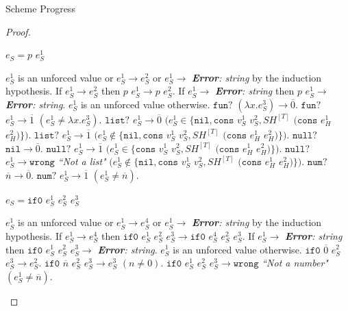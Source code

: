 \begin{theorem}{Scheme Progress}
\begin{proof}
\begin{case}
\end{case}


\begin{case}

$e_{S}=p$ $e_{S}^{1}$

$e_{S}^{1}$ is an unforced value or $e_{S}^{1}\rightarrow e_{S}^{2}$ or $e_{S}^{1}\rightarrow$ \emph{\textbf{Error}: string} by the induction hypothesis.  If $e_{S}^{1}\rightarrow e_{S}^{2}$ then $p$ $e_{S}^{1}\rightarrow p$ $e_{S}^{2}$.  If $e_{S}^{1}\rightarrow$ \emph{\textbf{Error}: string} then $p$ $e_{S}^{1}\rightarrow$ \emph{\textbf{Error}: string}.  $e_{S}^{1}$ is an unforced value otherwise.  $\mathtt{fun?}$ $(\lambda x.e_{S}^{3})\rightarrow\overline{0}$.  $\mathtt{fun?}$ $e_{S}^{1}\rightarrow\overline{1}$ $(e_{S}^{1}\neq\lambda x.e_{S}^{3})$.  $\mathtt{list?}$ $e_{S}^{1}\rightarrow\overline{0}$ $(e_{S}^{1}\in\lbrace\mathtt{nil},\mathtt{cons}$ $v_{S}^{1}$ $v_{S}^{2},SH^{[T]}$ $(\mathtt{cons}$ $e_{H}^{1}$ $e_{H}^{2})\rbrace)$.  $\mathtt{list?}$ $e_{S}^{1}\rightarrow\overline{1}$ $(e_{S}^{1}\not\in\lbrace\mathtt{nil},\mathtt{cons}$ $v_{S}^{1}$ $v_{S}^{2},SH^{[T]}$ $(\mathtt{cons}$ $e_{H}^{1}$ $e_{H}^{2})\rbrace)$.  $\mathtt{null?}$ $\mathtt{nil}\rightarrow\overline{0}$.  $\mathtt{null?}$ $e_{S}^{1}\rightarrow\overline{1}$ $(e_{S}^{1}\in\lbrace\mathtt{cons}$ $v_{S}^{1}$ $v_{S}^{2},SH^{[T]}$ $(\mathtt{cons}$ $e_{H}^{1}$ $e_{H}^{2})\rbrace)$.  $\mathtt{null?}$ $e_{S}^{1}\rightarrow\mathtt{wrong}$ \emph{``Not a list"} $(e_{S}^{1}\not\in\lbrace\mathtt{nil},\mathtt{cons}$ $v_{S}^{1}$ $v_{S}^{2},SH^{[T]}$ $(\mathtt{cons}$ $e_{H}^{1}$ $e_{H}^{2})\rbrace)$.  $\mathtt{num?}$ $\overline{n}\rightarrow\overline{0}$.  $\mathtt{num?}$ $e_{S}^{1}\rightarrow\overline{1}$ $(e_{S}^{1}\neq\overline{n})$.

\end{case}


\begin{case}

$e_{S}=\mathtt{if0}$ $e_{S}^{1}$ $e_{S}^{2}$ $e_{S}^{3}$

$e_{S}^{1}$ is an unforced value or $e_{S}^{1}\rightarrow e_{S}^{4}$ or $e_{S}^{1}\rightarrow$ \emph{\textbf{Error}: string} by the induction hypothesis.  If $e_{S}^{1}\rightarrow e_{S}^{4}$ then $\mathtt{if0}$ $e_{S}^{1}$ $e_{S}^{2}$ $e_{S}^{3}\rightarrow \mathtt{if0}$ $e_{S}^{4}$ $e_{S}^{2}$ $e_{S}^{3}$.  If $e_{S}^{1}\rightarrow$ \emph{\textbf{Error}: string} then $\mathtt{if0}$ $e_{S}^{1}$ $e_{S}^{2}$ $e_{S}^{3}\rightarrow$ \emph{\textbf{Error}: string}.  $e_{S}^{1}$ is an unforced value otherwise.  $\mathtt{if0}$ $\overline{0}$ $e_{S}^{2}$ $e_{S}^{3}\rightarrow e_{S}^{2}$.  $\mathtt{if0}$ $\overline{n}$ $e_{S}^{2}$ $e_{S}^{3}\rightarrow e_{S}^{3}$ $(n\neq 0)$.  $\mathtt{if0}$ $e_{S}^{1}$ $e_{S}^{2}$ $e_{S}^{3}\rightarrow\mathtt{wrong}$ \emph{``Not a number"} $(e_{S}^{1}\neq\overline{n})$.


\end{case}
\end{proof}
\end{theorem}
